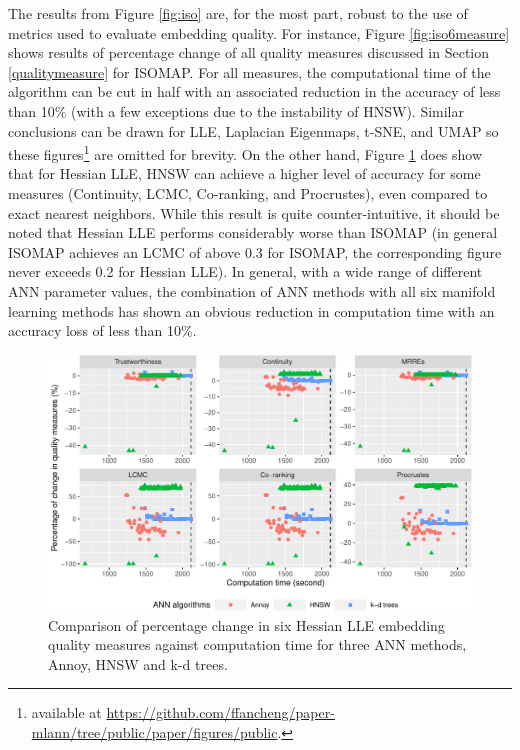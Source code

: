 \documentclass[11pt,a4paper,]{article}
\begin{document}
The results from Figure \ref{fig:iso} are, for the most part, robust to the use of metrics used to evaluate embedding quality. For instance, Figure \ref{fig:iso6measure} shows results of percentage change of all quality measures discussed in Section \ref{qualitymeasure} for ISOMAP. For all measures, the computational time of the algorithm can be cut in half with an associated reduction in the accuracy of less than 10\% (with a few exceptions due to the instability of HNSW). Similar conclusions can be drawn for LLE, Laplacian Eigenmaps, t-SNE, and UMAP so these figures\footnote{available at \url{https://github.com/ffancheng/paper-mlann/tree/public/paper/figures/public}.} are omitted for brevity.
On the other hand, Figure \ref{fig:hllemeasure} does show that for Hessian LLE, HNSW can achieve a higher level of accuracy for some measures (Continuity, LCMC, Co-ranking, and Procrustes), even compared to exact nearest neighbors. While this result is quite counter-intuitive, it should be noted that Hessian LLE performs considerably worse than ISOMAP (in general ISOMAP achieves an LCMC of above 0.3 for ISOMAP, the corresponding figure never exceeds 0.2 for Hessian LLE).
In general, with a wide range of different ANN parameter values, the combination of ANN methods with all six manifold learning methods has shown an obvious reduction in computation time with an accuracy loss of less than 10\%.

\begin{figure}

{\centering \includegraphics[width=1\linewidth]{mlann_ebs_files/figure-latex/hllemeasure-1} 

}

\caption{Comparison of percentage change in six Hessian LLE embedding quality measures against computation time for three ANN methods, Annoy, HNSW and k-d trees. }\label{fig:hllemeasure}
\end{figure}
\end{document}
